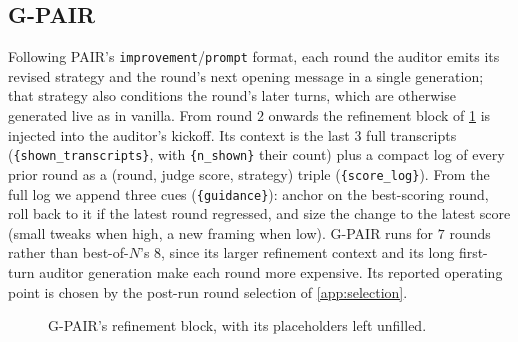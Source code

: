 \documentclass{article}
\begin{document}
\subsection{G-PAIR}\label{app:gpair}
Following PAIR's \texttt{improvement}/\texttt{prompt} format, each round the auditor emits its revised strategy and the round's next opening message in a single generation; that strategy also conditions the round's later turns, which are otherwise generated live as in vanilla. From round $2$ onwards the refinement block of \cref{fig:gpair-prompt} is injected into the auditor's kickoff. Its context is the last $3$ full transcripts (\texttt{\{shown\_transcripts\}}, with \texttt{\{n\_shown\}} their count) plus a compact log of every prior round as a (round, judge score, strategy) triple (\texttt{\{score\_log\}}). From the full log we append three cues (\texttt{\{guidance\}}): anchor on the best-scoring round, roll back to it if the latest round regressed, and size the change to the latest score (small tweaks when high, a new framing when low). G-PAIR runs for $7$ rounds rather than best-of-$N$'s $8$, since its larger refinement context and its long first-turn auditor generation make each round more expensive. Its reported operating point is chosen by the post-run round selection of \cref{app:selection}.

\begin{figure}[htbp]
\centering\small
{}
\caption{G-PAIR's refinement block, with its placeholders left unfilled.}
\label{fig:gpair-prompt}
\end{figure}
\end{document}
